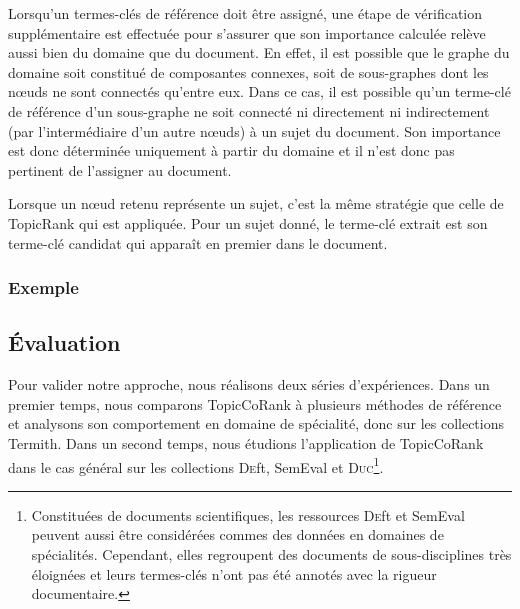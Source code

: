         Lorsqu'un termes-clés de référence doit être assigné, une étape de
        vérification supplémentaire est effectuée pour s'assurer que son
        importance calculée relève aussi bien du domaine que du document. En
        effet, il est possible que le graphe du domaine soit constitué de
        composantes connexes, soit de sous-graphes dont les n\oe{}uds ne sont
        connectés qu'entre eux. Dans ce cas, il est possible qu'un terme-clé de
        référence d'un sous-graphe ne soit connecté ni directement ni
        indirectement (par l'intermédiaire d'un autre n\oe{}uds) à un sujet du
        document. Son importance est donc déterminée uniquement à partir du
        domaine et il n'est donc pas pertinent de l'assigner au document.

        Lorsque un n\oe{}ud retenu représente un sujet, c'est la même stratégie
        que celle de TopicRank qui est appliquée. Pour un sujet donné, le
        terme-clé extrait est son terme-clé candidat qui apparaît en premier
        dans le document.

      \subsubsection{Exemple}
      \label{subsubsec:main-domain_specific_keyphrase_annotation-supervised_automatic_keyphrase_extraction-topiccorank-exemple}
        \TODO{\dots}

    \subsection{Évaluation}
    \label{subsec:main-domain_specific_keyphrase_annotation-supervised_automatic_keyphrase_annotation-evaluation}
      Pour valider notre approche, nous réalisons deux séries d'expériences.
      Dans un premier temps, nous comparons TopicCoRank à plusieurs méthodes de
      référence et analysons son comportement en domaine de spécialité, donc sur
      les collections Termith. Dans un second temps, nous étudions l'application
      de TopicCoRank dans le cas général sur les collections \textsc{De}ft,
      SemEval et \textsc{Duc}\footnote{Constituées de documents scientifiques,
      les ressources \textsc{De}ft et SemEval peuvent aussi être considérées
      commes des données en domaines de spécialités. Cependant, elles regroupent
      des documents de sous-disciplines très éloignées et leurs termes-clés
      n'ont pas été annotés avec la rigueur documentaire.}.

